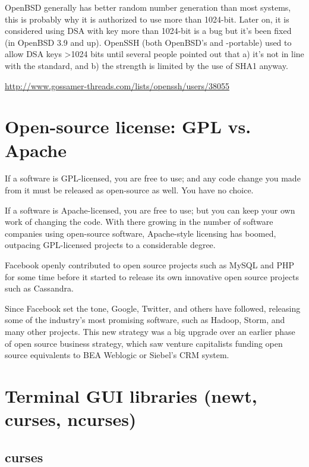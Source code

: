 \begin{mdframed}
OpenBSD generally has better random number generation than most systems, 
this is probably why it is authorized to use more than 1024-bit.
Later on, it is considered using DSA with key more than 1024-bit is a bug but
it's been fixed (in OpenBSD 3.9 and up). OpenSSH (both OpenBSD's and -portable)
used to allow DSA  keys >1024 bits until several people pointed out that a) it's
not in line with  the standard, and b) the strength is limited by the use of
SHA1 anyway.  

\url{http://www.gossamer-threads.com/lists/openssh/users/38055}
\end{mdframed}


\section{Open-source license: GPL vs. Apache}

If a software is GPL-licensed, you are free to use; and any code change you made
from it must be released as open-source as well. You have no choice.

If a software is Apache-licensed, you are free to use; but you can keep your own
work of changing the code. With there growing in the number of software
companies using open-source software,  Apache-style licensing has boomed,
outpacing GPL-licensed projects to a considerable degree.

Facebook openly contributed to open source projects such as MySQL and PHP for
some time before it started to release its own innovative open source projects such as Cassandra.

Since Facebook set the tone, Google, Twitter, and others have followed,
releasing some of the industry's most promising software, such as Hadoop, Storm,
and many other projects. This new strategy was a big upgrade over an earlier
phase of open source business strategy, which saw venture capitalists funding
open source equivalents to BEA Weblogic or Siebel's CRM system. 


\section{Terminal GUI libraries (newt, curses, ncurses)}

\subsection{curses}
\label{sec:curses}


